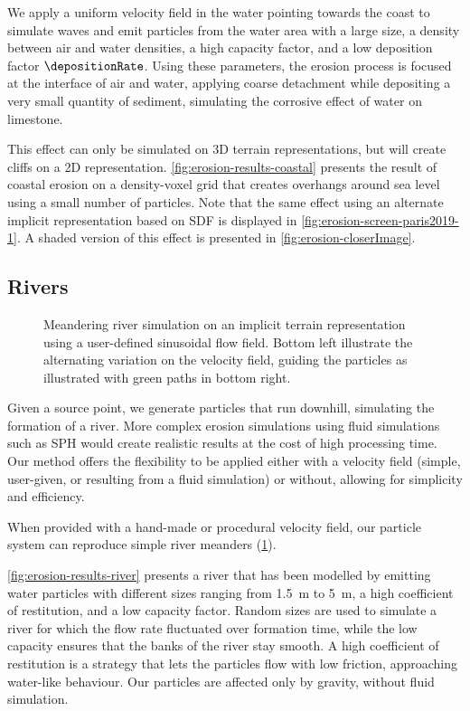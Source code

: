 We apply a uniform velocity field in the water pointing towards the coast to simulate waves and emit particles from the water area with a large size, a density between air and water densities, a high capacity factor, and a low deposition factor $\depositionRate$. Using these parameters, the erosion process is focused at the interface of air and water, applying coarse detachment while depositing a very small quantity of sediment, simulating the corrosive effect of water on limestone. 

This effect can only be simulated on 3D terrain representations, but will create cliffs on a 2D representation.  
\cref{fig:erosion-results-coastal} presents the result of coastal erosion on a density-voxel grid that creates overhangs around sea level using a small number of particles. Note that the same effect using an alternate implicit representation based on SDF is displayed in \cref{fig:erosion-screen-paris2019-1}.  
A shaded version of this effect is presented in \cref{fig:erosion-closerImage}.

\subsection{Rivers}

\begin{figure}[H]
    \caption{Meandering river simulation on an implicit terrain representation using a user-defined sinusoidal flow field. Bottom left illustrate the alternating variation on the velocity field, guiding the particles as illustrated with green paths in bottom right. }
    \label{fig:erosion-results-meanders}
\end{figure}

Given a source point, we generate particles that run downhill, simulating the formation of a river. More complex erosion simulations using fluid simulations such as SPH \cite{Kristof2009} would create realistic results at the cost of high processing time. Our method offers the flexibility to be applied either with a velocity field (simple, user-given, or resulting from a fluid simulation) or without, allowing for simplicity and efficiency.

When provided with a hand-made or procedural velocity field, our particle system can reproduce simple river meanders (\cref{fig:erosion-results-meanders}). %

\cref{fig:erosion-results-river} presents a river that has been modelled by emitting water particles with different sizes ranging from \SI{1.5}{\meter} to \SI{5}{\meter}, a high coefficient of restitution, and a low capacity factor. Random sizes are used to simulate a river for which the flow rate fluctuated over formation time, while the low capacity ensures that the banks of the river stay smooth. A high coefficient of restitution is a strategy that lets the particles flow with low friction, approaching water-like behaviour. Our particles are affected only by gravity, without fluid simulation.

